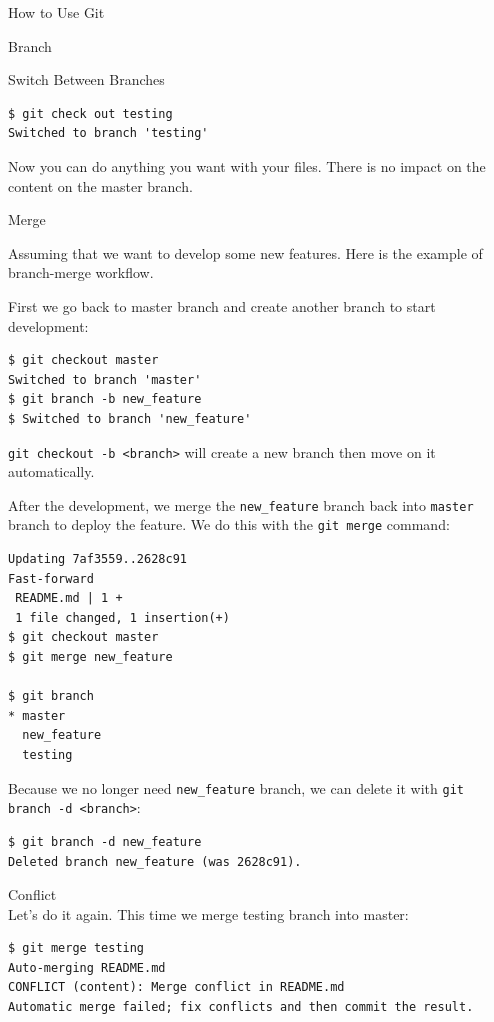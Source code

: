 \documentclass[10pt, a4papaer]{article}
\begin{document}
\begin{section}{How to Use Git}
\begin{subsection}{Branch}
\begin{paragraph}{Switch Between Branches\\}
\begin{lstlisting}
$ git check out testing
Switched to branch 'testing'
\end{lstlisting}

Now you can do anything you want with your files. There is no impact on the content
on the master branch.
\end{paragraph}

\begin{paragraph}{Merge\\}

Assuming that we want to develop some new features. Here is the example of
branch-merge workflow.

First we go back to master branch and create another branch to start development:

\begin{lstlisting}
$ git checkout master
Switched to branch 'master'
$ git branch -b new_feature
$ Switched to branch 'new_feature'
\end{lstlisting}

\verb|git checkout -b <branch>| will create a new branch then move on it automatically.

After the development, we merge the \verb|new_feature| branch back into 
\verb|master| branch to deploy the feature. We do this with the \verb|git merge|
command:

\begin{lstlisting}
Updating 7af3559..2628c91
Fast-forward
 README.md | 1 +
 1 file changed, 1 insertion(+)
$ git checkout master
$ git merge new_feature

$ git branch
* master
  new_feature
  testing
\end{lstlisting}

Because we no longer need \verb|new_feature| branch, we can delete it with
\verb|git branch -d <branch>|:

\begin{lstlisting}
$ git branch -d new_feature
Deleted branch new_feature (was 2628c91).
\end{lstlisting}
\end{paragraph}

\begin{paragraph}{Conflict\\}
Let's do it again. This time we merge testing branch into master:

\begin{lstlisting}
$ git merge testing
Auto-merging README.md
CONFLICT (content): Merge conflict in README.md
Automatic merge failed; fix conflicts and then commit the result.
\end{lstlisting}


\end{paragraph}
\end{subsection}
\end{section}
\end{document}
